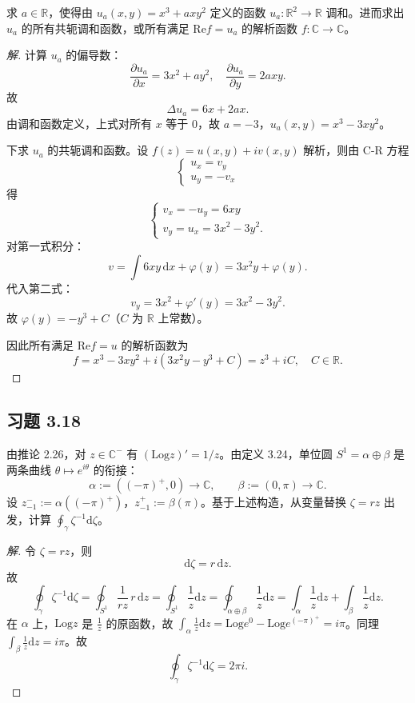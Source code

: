 \documentclass[11pt,a4paper]{article}
\newcommand{\R}{\mathbb{R}}
\newcommand{\C}{\mathbb{C}}
\renewcommand{\Re}{\mathrm{Re}}
\newcommand{\Log}{\mathrm{Log}}
\newcommand{\dd}{\mathrm{d}}
\theoremstyle{definition}
\newenvironment{solution}{\begin{proof}[解]}{\end{proof}}
\begin{document}
求 $a \in \R$，使得由 $u_a(x, y) = x^3 + axy^2$ 定义的函数 $u_a : \R^2 \to \R$ 调和。进而求出 $u_a$ 的所有共轭调和函数，或所有满足 $\Re f = u_a$ 的解析函数 $f : \C \to \C$。

\begin{solution}
计算 $u_a$ 的偏导数：
\[
  \frac{\partial u_a}{\partial x} = 3x^2 + ay^2, \quad
  \frac{\partial u_a}{\partial y} = 2axy.
\]
故
\[
  \Delta u_a = 6x+2ax.
\]
由调和函数定义，上式对所有 $x$ 等于 $0$，故 $a = -3$，$u_a(x,y) = x^3-3xy^2$。

下求 $u_a$ 的共轭调和函数。设 $f(z) = u(x,y) + iv(x,y)$ 解析，则由 C-R 方程
\[
  \begin{cases}
    u_x = v_y \\
    u_y = -v_x
  \end{cases}
\]
得
\[
  \begin{cases}
    v_x = -u_y = 6xy \\
    v_y = u_x = 3x^2 - 3y^2.
  \end{cases}
\]
对第一式积分：
\[
  v = \int 6xy \,\mathrm{d}x + \varphi(y) = 3x^2y+\varphi(y).
\]
代入第二式：
\[
  v_y = 3x^2 + \varphi'(y) = 3x^2 - 3y^2.
\]
故 $\varphi(y) = -y^3 + C$（$C$ 为 $\mathbb{R}$ 上常数）。

因此所有满足 $\Re f = u$ 的解析函数为
\[
  f = x^3 - 3xy^2 + i(3x^2 y - y^3 + C) = z^3 + iC,\quad C \in \mathbb{R}.
\]
\end{solution}

\subsection{习题 3.18}

由推论 2.26，对 $z \in \C^-$ 有 $(\Log z)' = 1/z$。由定义 3.24，单位圆 $S^1 = \alpha \oplus \beta$ 是两条曲线 $\theta \mapsto e^{i\theta}$ 的衔接：
\[
  \alpha := ((-\pi)^+, 0) \to \C, \qquad \beta := (0, \pi) \to \C.
\]
设 $z_{-1}^- := \alpha((-\pi)^+)$，$z_{-1}^+ := \beta(\pi)$。基于上述构造，从变量替换 $\zeta = rz$ 出发，计算 $\oint_\gamma \zeta^{-1}\dd\zeta$。

\begin{solution}
令 $\zeta = rz$，则
\[
  \dd \zeta = r\, \dd z.
\]
故
\[
  \oint_\gamma \zeta^{-1} \dd \zeta = \oint_{S^1} \frac{1}{rz}\, r\,\dd z = \oint_{S^1}\frac{1}{z} \dd z = \oint_{\alpha\oplus \beta} \frac{1}{z} \dd z =
  \int_{\alpha} \frac{1}{z} \dd z + \int_{\beta} \frac{1}{z} \dd z.
\]
在 $\alpha$ 上，$\Log z$ 是 $\frac{1}{z}$ 的原函数，故 $\int_\alpha \frac{1}{z} \dd z = \Log e^0 - \Log e^{(-\pi)^+} = i\pi$。同理 $\int_\beta \frac{1}{z} \dd z = i\pi$。故
\[
  \oint_\gamma \zeta^{-1} \dd \zeta = 2\pi i.
\]
\end{solution}
\end{document}
